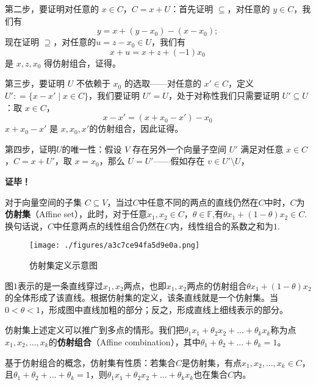 第二步，要证明对任意的 $x \in C$，$C = x + U$：首先证明 $\subseteq$，对任意的 $y \in C$，我们有
\begin{equation}
y = x + (y - x_0) - (x - x_0); ~
\end{equation}
现在证明 $\supseteq$，对任意的$u  = z - x_0 \in U$，我们有
\begin{equation}
x + u = x + z + (-1) x_0 ~
\end{equation}
是 $x, z, x_0$ 得仿射组合，证得。

第三步，要证明 $U$ 不依赖于 $x_0$ 的选取——对任意的 $x' \in C$，定义 $U': = \{x - x' \mid x \in C\}$，我们要证明 $U' = U$，处于对称性我们只需要证明 $U' \subseteq U$：取 $x \in C$，
\begin{equation}
x - x' = (x + x_0 - x') - x_0 ~
\end{equation}
$x + x_0 - x'$ 是 $x, x_0, x'$的仿射组合，因此证得。

第四步，证明$U$的唯一性：假设 $V$ 存在另外一个向量子空间 $U'$ 满足对任意 $x \in C$，$C = x + U'$，取 $x = x_0$，那么 $U = U'$——假如存在 $v \in U' \setminus U$，





\textbf{证毕！}



\begin{theorem}{}
对于向量空间的子集 $C \subseteq V$，当过$C$中任意不同的两点的直线仍然在$C$中时，$C$为\textbf{仿射集}（Affine set），此时，对于任意$x_1,x_2 \in C$，$\theta \in \mathbb{F}$,有$\theta x_1+(1-\theta)x_2 \in C$.换句话说，$C$中任意两点的线性组合仍然在$C$内，线性组合的系数之和为$1$.
\end{theorem}


\begin{figure}[ht]
\centering
\texttt{[image: ./figures/a3c7ce94fa5d9e0a.png]}
\caption{仿射集定义示意图} \label{fig_AffSet_1}
\end{figure}

图$1$表示的是一条直线穿过$x_1,x_2$两点，也即$x_1,x_2$两点的仿射组合$\theta x_1+(1-\theta)x_2$的全体形成了该直线。根据仿射集的定义，该条直线就是一个仿射集。当$0<\theta<1$，形成图中直线加粗的部分；反之，形成直线上细线表示的部分。

仿射集上述定义可以推广到多点的情形。我们把$\theta_1x_1+\theta_2x_2+...+\theta_kx_k$称为点$x_1,x_2,...,x_k$的\textbf{仿射组合}（Affine combination），其中$\theta_1+\theta_2+...+\theta_k=1$。

基于仿射组合的概念，仿射集有性质：若集合$C$是仿射集，有点$x_1,x_2,...,x_k \in C$，且$\theta_1+\theta_2+...+\theta_k=1$，则$\theta_1x_1+\theta_2x_2+...+\theta_kx_k$也在集合$C$内。
